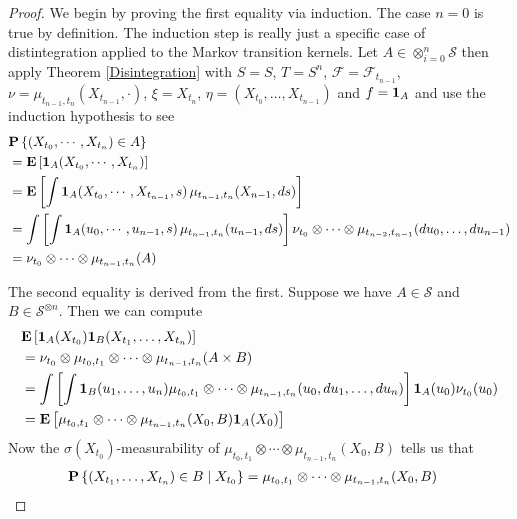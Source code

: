 \begin{proof}
We begin by proving the first equality via induction.  The case $n=0$
is true by definition.  The induction step is 
really just a specific case of distintegration applied to the Markov transition kernels.  Let $A
\in \otimes_{i=0}^n \mathcal{S}$ then apply Theorem 
\ref{Disintegration} with $S=S$, $T=S^n$, $\mathcal{F}=\mathcal{F}_{t_{n-1}}$,
$\nu=\mu_{t_{n-1}, t_n}(X_{t_{n-1}}, \cdot)$, $\xi = X_{t_n}$, $\eta=(X_{t_0},
\dotsc,X_{t_{n-1}})$ and $f = \characteristic{A}$ and use the
induction hypothesis to see
\begin{align*}
&\probability{(X_{t_0}, \cdots, X_{t_n}) \in A} \\
&=\expectation{\characteristic{A}(X_{t_0}, \cdots, X_{t_n})} \\
&=\expectation{\int \characteristic{A}(X_{t_0}, \cdots, X_{t_{n-1}},s)
  \, \mu_{t_{n-1}, t_n} (X_{n-1}, ds)} \\
&=\int \left [ \int \characteristic{A}(u_0, \cdots,u_{n-1}, s)   \,
  \mu_{t_{n-1}, t_n} (u_{n-1}, ds) \right ] \nu_{t_0} \otimes \cdots \otimes
  \mu_{t_{n-2}, t_{n-1}}(du_0, \dotsc, du_{n-1})\\
&=\nu_{t_0} \otimes \cdots \otimes  \mu_{t_{n-1}, t_{n}}(A)
\end{align*}

The second equality is derived from the first.  Suppose we have $A \in
\mathcal{S}$ and $B \in \mathcal{S}^{\otimes n}$.  Then we can compute
\begin{align*}
&\expectation{\characteristic{A}(X_{t_0}) \characteristic{B}(X_{t_1},
  \dotsc, X_{t_n})}  \\
&= \nu_{t_0} \otimes \mu_{t_0, t_1} \otimes \cdots \otimes  \mu_{t_{n-1},
  t_{n}}(A \times B) \\
&= \int \left [ \int \characteristic{B}(u_1, \dotsc, u_n) \mu_{t_0,
    t_1} \otimes \cdots \otimes \mu_{t_{n-1}, t_n} (u_0, du_1, \dotsc, du_n) \right ]
\characteristic{A}(u_0) \nu_{t_0}(u_0) \\
&=\expectation{\mu_{t_0, t_1} \otimes \cdots \otimes \mu_{t_{n-1},
    t_n}(X_0, B) \characteristic{A}(X_0)}
\end{align*}
Now the $\sigma(X_{t_0})$-measurability of $\mu_{t_0, t_1} \otimes \cdots \otimes \mu_{t_{n-1},
    t_n}(X_0, B)$ tells us that 
\begin{align*}
\cprobability{X_{t_0}}{(X_{t_1},\dotsc, X_{t_n}) \in B} 
&= \mu_{t_0, t_1} \otimes \cdots \otimes \mu_{t_{n-1},    t_n}(X_0, B)
\end{align*}


\end{proof}
